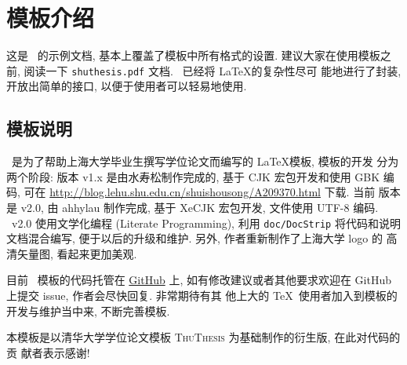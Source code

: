 \chapter{模板介绍}
\label{cha:intro}

这是 \shuthesis\ 的示例文档, 基本上覆盖了模板中所有格式的设置. 建议大家在使用模板之
前, 阅读一下 \texttt{shuthesis.pdf} 文档. \shuthesis\ 已经将 \LaTeX 的复杂性尽可
能地进行了封装, 开放出简单的接口, 以便于使用者可以轻易地使用.
 
\section{模板说明}
\shuthesis\ 是为了帮助上海大学毕业生撰写学位论文而编写的 \LaTeX 模板, 模板的开发
分为两个阶段: 版本 v1.x 是由水寿松制作完成的, 基于 CJK 宏包开发和使用 GBK 编码, 
可在 \url{http://blog.lehu.shu.edu.cn/shuishousong/A209370.html} 下载. 当前
版本是 v2.0, 由 ahhylau 制作完成, 基于 XeCJK 宏包开发, 文件使用 UTF-8 编码. 
\shuthesis\ v2.0 使用文学化编程 (Literate Programming), 利用 \texttt{doc/DocStrip} 
将代码和说明文档混合编写, 便于以后的升级和维护. 另外, 作者重新制作了上海大学 logo 的
高清矢量图, 看起来更加美观. 

目前 \shuthesis\ 模板的代码托管在 \href{https://github.com/ahhylau/shuthesis}{GitHub} 
上, 如有修改建议或者其他要求欢迎在 GitHub 上提交 issue, 作者会尽快回复. 非常期待有其
他上大的 \TeX\ 使用者加入到模板的开发与维护当中来, 不断完善模板.

本模板是以清华大学学位论文模板 \textsc{ThuThesis} 为基础制作的衍生版, 在此对代码的贡
献者表示感谢! 


